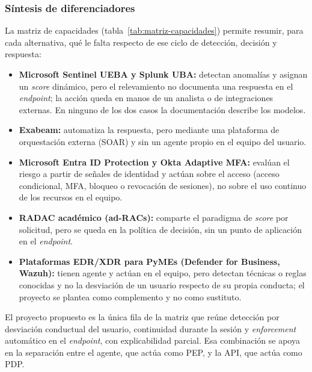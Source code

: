 \subsubsection{Síntesis de diferenciadores}
\label{sec:sintesis-diferenciadores}
La matriz de capacidades (tabla~\ref{tab:matriz-capacidades}) permite resumir, para cada alternativa, qué le falta respecto de ese ciclo de detección, decisión y respuesta:
\begin{itemize}
	\item \textbf{Microsoft Sentinel UEBA y Splunk UBA:} detectan anomalías y asignan un \emph{score} dinámico, pero el relevamiento no documenta una respuesta en el \emph{endpoint}; la acción queda en manos de un analista o de integraciones externas. En ninguno de los dos casos la documentación describe los modelos.
	\item \textbf{Exabeam:} automatiza la respuesta, pero mediante una plataforma de orquestación externa (SOAR) y sin un agente propio en el equipo del usuario.
	\item \textbf{Microsoft Entra ID Protection y Okta Adaptive MFA:} evalúan el riesgo a partir de señales de identidad y actúan sobre el acceso (acceso condicional, MFA, bloqueo o revocación de sesiones), no sobre el uso continuo de los recursos en el equipo.
	\item \textbf{RADAC académico (ad-RACs):} comparte el paradigma de \emph{score} por solicitud, pero se queda en la política de decisión, sin un punto de aplicación en el \emph{endpoint}.
	\item \textbf{Plataformas EDR/XDR para PyMEs (Defender for Business, Wazuh):} tienen agente y actúan en el equipo, pero detectan técnicas o reglas conocidas y no la desviación de un usuario respecto de su propia conducta; el proyecto se plantea como complemento y no como sustituto.
\end{itemize}

El proyecto propuesto es la única fila de la matriz que reúne detección por desviación conductual del usuario, continuidad durante la sesión y \emph{enforcement} automático en el \emph{endpoint}, con explicabilidad parcial. Esa combinación se apoya en la separación entre el agente, que actúa como PEP, y la API, que actúa como PDP.
